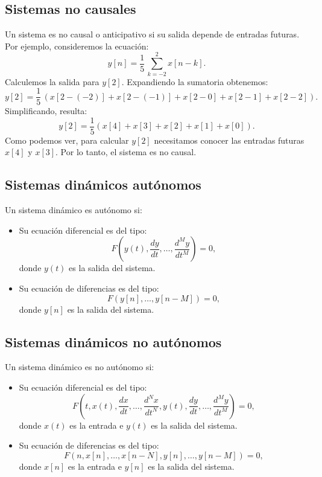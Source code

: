 \subsection{Sistemas no causales}
Un sistema es no causal o anticipativo si su salida depende de entradas futuras. Por ejemplo, consideremos la ecuación:
\begin{equation}
	y[n] = \frac{1}{5} \, \sum_{k=-2}^{2}x[n-k].
\end{equation}
Calculemos la salida para $y[2]$. Expandiendo la sumatoria obtenemos:
\begin{equation}
	y[2] = \frac{1}{5} \, \left( x[2-(-2)] + x[2-(-1)] + x[2-0] + x[2-1] + x[2-2] \right).
\end{equation}
Simplificando, resulta:
\begin{equation}
	y[2] = \frac{1}{5} \left( x[4] + x[3] + x[2] + x[1] + x[0] \right).
\end{equation}
Como podemos ver, para calcular $y[2]$ necesitamos conocer las entradas futuras $x[4]$ y $x[3]$. Por lo tanto, el sistema es no causal.

\subsection{Sistemas dinámicos autónomos}
Un sistema dinámico es autónomo si:
\begin{itemize}
	\item Su ecuación diferencial es del tipo:
	\begin{equation}
		F\left(y(t), \frac{dy}{dt}, \dots, \frac{d^{M}y}{dt^{M}}\right) = 0,                  
	\end{equation}
	donde $y(t)$ es la salida del sistema.
	\item Su ecuación de diferencias es del tipo:
	\begin{equation}
		F(y[n], \dots, y[n-M]) = 0, 
	\end{equation}
	donde $y[n]$ es la salida del sistema.
\end{itemize}

\subsection{Sistemas dinámicos no autónomos}
Un sistema dinámico es no autónomo si:
\begin{itemize}
	\item Su ecuación diferencial es del tipo:
	\begin{equation}
		F\left(t, x(t), \frac{dx}{dt}, \dots, \frac{d^{N}x}{dt^{N}}, y(t), \frac{dy}{dt}, \dots, \frac{d^{M}y}{dt^{M}}\right) = 0,
	\end{equation}
	donde $x(t)$ es la entrada e $y(t)$ es la salida del sistema.
	\item Su ecuación de diferencias es del tipo:
	\begin{equation}
		F(n, x[n], \dots, x[n-N], y[n], \dots, y[n-M]) = 0, 
	\end{equation}
	donde $x[n]$ es la entrada e $y[n]$ es la salida del sistema.
\end{itemize}


